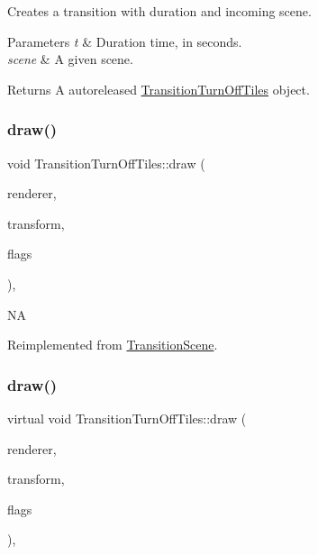 Creates a transition with duration and incoming scene.


\begin{DoxyParams}{Parameters}
{\em t} & Duration time, in seconds. \\
\hline
{\em scene} & A given scene. \\
\hline
\end{DoxyParams}
\begin{DoxyReturn}{Returns}
A autoreleased \hyperlink{classTransitionTurnOffTiles}{Transition\+Turn\+Off\+Tiles} object. 
\end{DoxyReturn}
\mbox{\label{classTransitionTurnOffTiles_a467ba195c2e7d161fd31436362734968}} 
\subsubsection{\texorpdfstring{draw()}{draw()}\hspace{0.1cm}{\footnotesize\ttfamily [1/2]}}
{\footnotesize\ttfamily void Transition\+Turn\+Off\+Tiles\+::draw (\begin{DoxyParamCaption}\item[{\hyperlink{classRenderer}{Renderer} $\ast$}]{renderer,  }\item[{const \hyperlink{classMat4}{Mat4} \&}]{transform,  }\item[{uint32\+\_\+t}]{flags }\end{DoxyParamCaption})\hspace{0.3cm}{\ttfamily [override]}, {\ttfamily [virtual]}}

NA 

Reimplemented from \hyperlink{classTransitionScene_ae3600e652909eeae3113bc39ce8ef8d1}{Transition\+Scene}.

\mbox{\label{classTransitionTurnOffTiles_adadbe8ec95b4e789ffe4659a7d03fa43}} 
\subsubsection{\texorpdfstring{draw()}{draw()}\hspace{0.1cm}{\footnotesize\ttfamily [2/2]}}
{\footnotesize\ttfamily virtual void Transition\+Turn\+Off\+Tiles\+::draw (\begin{DoxyParamCaption}\item[{\hyperlink{classRenderer}{Renderer} $\ast$}]{renderer,  }\item[{const \hyperlink{classMat4}{Mat4} \&}]{transform,  }\item[{uint32\+\_\+t}]{flags }\end{DoxyParamCaption})\hspace{0.3cm}{\ttfamily [override]}, {\ttfamily [virtual]}}


